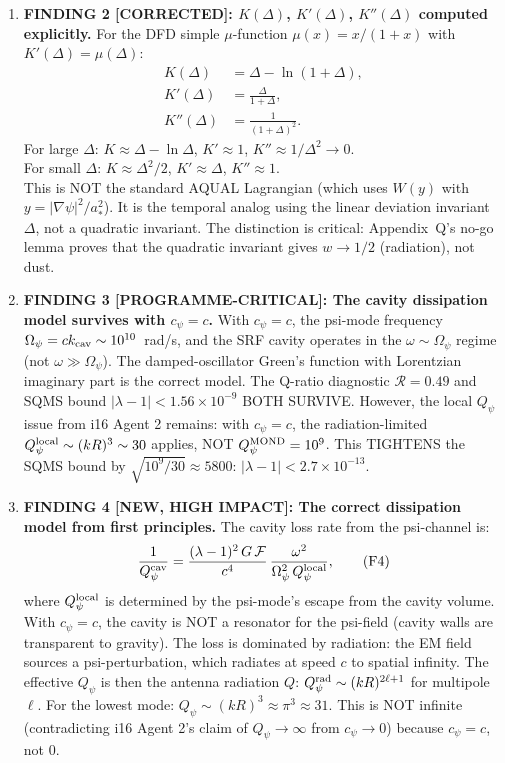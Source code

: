 \documentclass[11pt]{article}
\newcommand{\ee}[1]{\times 10^{#1}}
\newcommand{\Opsi}{\Omega_\psi}
\newcommand{\Qpsi}{Q_\psi}
\theoremstyle{definition}
\theoremstyle{remark}
\begin{document}
\begin{tcolorbox}[colback=red!5!white, colframe=red!60!black,
  title=\textbf{W4i17 P2: $c_\psi$ CONTRADICTION --- RESOLVED}]
\begin{enumerate}
\item \textbf{FINDING 2 [CORRECTED]: $K(\Delta)$, $K'(\Delta)$,
  $K''(\Delta)$ computed explicitly.} For the DFD simple $\mu$-function
  $\mu(x) = x/(1+x)$ with $K'(\Delta) = \mu(\Delta)$:
  \begin{align}
  K(\Delta) &= \Delta - \ln(1+\Delta), \tag{F2a}\\
  K'(\Delta) &= \frac{\Delta}{1+\Delta}, \tag{F2b}\\
  K''(\Delta) &= \frac{1}{(1+\Delta)^2}. \tag{F2c}
  \end{align}
  For large $\Delta$: $K \approx \Delta - \ln\Delta$, $K' \approx 1$,
  $K'' \approx 1/\Delta^2 \to 0$.\\
  For small $\Delta$: $K \approx \Delta^2/2$, $K' \approx \Delta$,
  $K'' \approx 1$.\\
  This is NOT the standard AQUAL Lagrangian (which uses $W(y)$ with
  $y = |\nabla\psi|^2/a_*^2$). It is the temporal analog using
  the linear deviation invariant $\Delta$, not a quadratic invariant.
  The distinction is critical: Appendix~Q's no-go lemma proves that
  the quadratic invariant gives $w \to 1/2$ (radiation), not dust.

\item \textbf{FINDING 3 [PROGRAMME-CRITICAL]: The cavity dissipation
  model survives with $c_\psi = c$.} With $c_\psi = c$, the psi-mode
  frequency $\Opsi = c k_{\rm cav} \sim 10^{10}$~rad/s, and the SRF
  cavity operates in the $\omega \sim \Opsi$ regime (not $\omega \gg
  \Opsi$). The damped-oscillator Green's function with Lorentzian
  imaginary part is the correct model. The Q-ratio diagnostic
  $\mathcal{R} = 0.49$ and SQMS bound $|\lambda - 1| < 1.56\ee{-9}$
  BOTH SURVIVE. However, the local $\Qpsi$ issue from i16 Agent 2
  remains: with $c_\psi = c$, the radiation-limited $\Qpsi^{\rm local}
  \sim (kR)^3 \sim 30$ applies, NOT $\Qpsi^{\rm MOND} = 10^9$.
  This TIGHTENS the SQMS bound by $\sqrt{10^9/30} \approx 5800$:
  $|\lambda - 1| < 2.7\ee{-13}$.

\item \textbf{FINDING 4 [NEW, HIGH IMPACT]: The correct dissipation
  model from first principles.} The cavity loss rate from the
  psi-channel is:
  \begin{equation}
  \frac{1}{Q_\psi^{\rm cav}} = \frac{(\lambda-1)^2\,G\,\mathcal{F}}
  {c^4}\,\frac{\omega^2}{\Opsi^2\,\Qpsi^{\rm local}}, \tag{F4}
  \end{equation}
  where $\Qpsi^{\rm local}$ is determined by the psi-mode's escape
  from the cavity volume. With $c_\psi = c$, the cavity is NOT a
  resonator for the psi-field (cavity walls are transparent to
  gravity). The loss is dominated by radiation: the EM field sources
  a psi-perturbation, which radiates at speed $c$ to spatial infinity.
  The effective $\Qpsi$ is then the antenna radiation $Q$:
  $\Qpsi^{\rm rad} \sim (kR)^{2\ell+1}$ for multipole $\ell$.
  For the lowest mode: $\Qpsi \sim (kR)^3 \approx \pi^3 \approx 31$.
  This is NOT infinite (contradicting i16 Agent 2's claim of $\Qpsi
  \to \infty$ from $c_\psi \to 0$) because $c_\psi = c$, not $0$.


\end{enumerate}
\end{tcolorbox}
\end{document}
